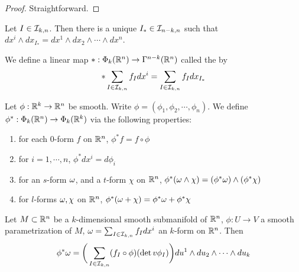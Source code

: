 \documentclass{book}
\begin{document}
	\begin{proof}
		Straightforward.
	\end{proof}

	\begin{ex}
		Let $I \in \mathcal{I}_{k, n}$. Then there is a unique $I_* \in \mathcal{I}_{n-k, n}$ such that $dx^i \wedge dx_{I_*} = dx^1 \wedge dx_2 \wedge \cdots \wedge dx^n$.
	\end{ex}
	
	\begin{defn}
		We define a linear map $*:\Phi_k(\mathbb{R}^n) \rightarrow \Gamma^{n-k}(\mathbb{R}^n)$ called the  by $$* \sum\limits_{I \in \mathcal{I}_{k,n}} f_I dx^i = \sum\limits_{I \in \mathcal{I}_{k,n}} f_Idx_{I_*}$$
	\end{defn}

	\begin{defn}
		Let $\phi: \mathbb{R}^k \rightarrow \mathbb{R}^n$ be smooth. Write $\phi = (\phi_1, \phi_2, \cdots, \phi_n)$. We define $\phi^*:\Phi_k(\mathbb{R}^n) \rightarrow \Phi_k(\mathbb{R}^k)$ via the following properties: 
		\begin{enumerate}
			\item for each $0$-form $f$ on $\mathbb{R}^n$, $\phi^*f = f \circ \phi$
			\item  for $i = 1, \cdots , n$, $\phi^* dx^i = d\phi_i$ 
			\item for an $s$-form $\omega$, and a $t$-form $\chi$ on $\mathbb{R}^n$,  $\phi^* (\omega \wedge \chi) = (\phi^*\omega) \wedge (\phi^*\chi)$
			\item for $l$-forms $\omega, \chi$ on $\mathbb{R}^n$, $\phi^*(\omega + \chi) = \phi^*\omega + \phi^*\chi$ 
		\end{enumerate}
	\end{defn}

	\begin{ex}
			Let $M \subset \mathbb{R}^n$ be a $k$-dimensional smooth submanifold of $\mathbb{R}^n$, $\phi: U \rightarrow V$ a smooth parametrization of $M$, $\omega = \sum_{I \in \mathcal{I}_{k,n}} f_Idx^i$  an $k$-form on $\mathbb{R}^n$. Then $$\phi^* \omega = \bigg( \sum_{I \in \mathcal{I}_{k, n}} (f_I \circ \phi) (\det v\phi_I)\bigg)du^1 \wedge du_2 \wedge \cdots \wedge du_k$$ 
	\end{ex}
\end{document}
